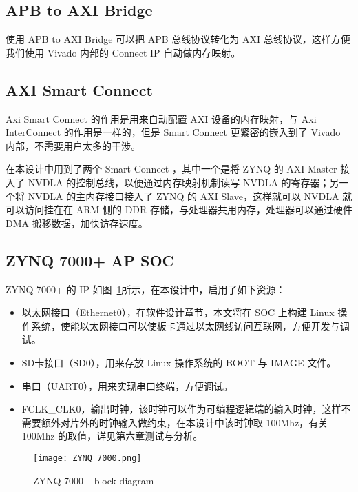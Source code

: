 \subsection{APB to AXI Bridge}

使用 APB to AXI Bridge 可以把 APB 总线协议转化为 AXI 总线协议，这样方便我们使用 Vivado 内部的 Connect IP 自动做内存映射。

\subsection{AXI Smart Connect}

Axi Smart Connect 的作用是用来自动配置 AXI 设备的内存映射，与 Axi InterConnect 的作用是一样的，但是 Smart Connect 更紧密的嵌入到了 Vivado 内部，不需要用户太多的干涉。

在本设计中用到了两个 Smart Connect ，其中一个是将 ZYNQ 的 AXI Master 接入了 NVDLA 的控制总线，以便通过内存映射机制读写 NVDLA 的寄存器；另一个将 NVDLA 的主内存接口接入了 ZYNQ 的 AXI Slave，这样就可以 NVDLA 就可以访问挂在在 ARM 侧的 DDR 存储，与处理器共用内存，处理器可以通过硬件 DMA 搬移数据，加快访存速度。

\subsection{ZYNQ 7000+ AP SOC}

ZYNQ 7000+ 的 IP 如图~\ref{fig:ZYNQ 7000+}所示，在本设计中，启用了如下资源：

\begin{itemize}
    \item 以太网接口（Ethernet0），在软件设计章节，本文将在 SOC 上构建 Linux 操作系统，使能以太网接口可以使板卡通过以太网线访问互联网，方便开发与调试。
    \item SD卡接口（SD0），用来存放 Linux 操作系统的 BOOT 与 IMAGE 文件。
    \item 串口（UART0），用来实现串口终端，方便调试。
    \item FCLK\_CLK0，输出时钟，该时钟可以作为可编程逻辑端的输入时钟，这样不需要额外对片外的时钟输入做约束，在本设计中该时钟取 100Mhz，有关 100Mhz 的取值，详见第六章测试与分析。
\end{itemize}

\begin{figure}[!htbp]
    \centering
    \texttt{[image: ZYNQ 7000.png]}
    \caption{ZYNQ 7000+ block diagram}
    \label{fig:ZYNQ 7000+}
\end{figure}










